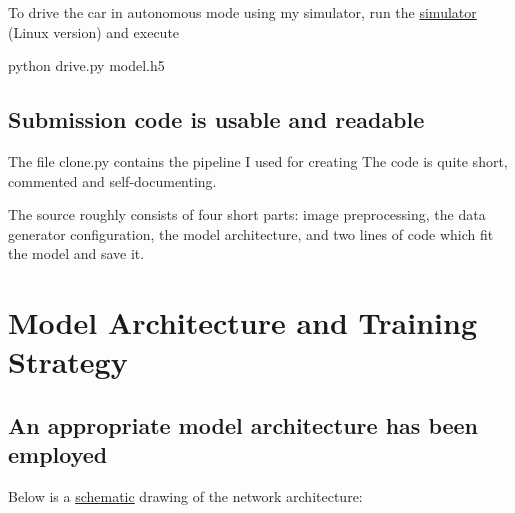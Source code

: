 \documentclass[a4paper,10pt]{article}
\begin{document}
To drive the car in autonomous mode using my simulator,
run the \href{https://d17h27t6h515a5.cloudfront.net/topher/2017/February/58ae46bb_linux-sim/linux-sim.zip}{simulator} (Linux version)
and execute

\begin{center}
python drive.py model.h5
\end{center}

\subsection{Submission code is usable and readable}

The file clone.py contains the pipeline I used for creating 
The code is quite short, commented and self-documenting.

The source roughly consists of four short parts: image preprocessing, the data generator configuration, the model architecture,
and two lines of code which fit the model and save it.

\section{Model Architecture and Training Strategy}


\subsection{An appropriate model architecture has been employed}
\def\layersep{1.6cm}

Below is a \underline{schematic} drawing of the network architecture:
\end{document}
